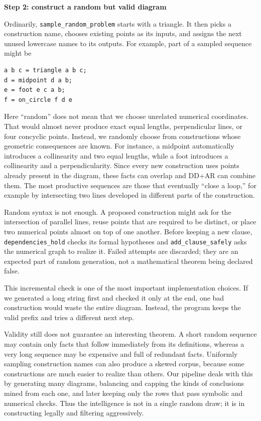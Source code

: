 \documentclass[reqno]{amsart}
\newcommand{\examplepart}[1]{%
    \par\medskip
    \noindent\textbf{\color{agblue}#1}\par\smallskip\noindent
}
\DeclareMathOperator{\1}{\textbf{1}}
\begin{document}
\examplepart{Step 2: construct a random but valid diagram}

Ordinarily, \verb|sample_random_problem| starts with a triangle. It then picks
a construction name, chooses existing points as its inputs, and assigns the
next unused lowercase names to its outputs. For example, part of a sampled
sequence might be
\begin{lstlisting}
a b c = triangle a b c;
d = midpoint d a b;
e = foot e c a b;
f = on_circle f d e
\end{lstlisting}

Here ``random'' does not mean that we choose unrelated numerical coordinates.
That would almost never produce exact equal lengths, perpendicular lines, or
four concyclic points.  Instead, we randomly choose from constructions whose
geometric consequences are known.  For instance, a midpoint automatically
introduces a collinearity and two equal lengths, while a foot introduces a
collinearity and a perpendicularity.  Since every new construction uses
points already present in the diagram, these facts can overlap and DD+AR can
combine them.  The most productive sequences are those that eventually
``close a loop,'' for example by intersecting two lines developed in different
parts of the construction.

Random syntax is not enough. A proposed construction might ask for the
intersection of parallel lines, reuse points that are required to be distinct,
or place two numerical points almost on top of one another. Before keeping a
new clause, \verb|dependencies_hold| checks its formal hypotheses and
\verb|add_clause_safely| asks the numerical graph to realize it. Failed
attempts are discarded; they are an expected part of random generation, not a
mathematical theorem being declared false.

This incremental check is one of the most important implementation choices.
If we generated a long string first and checked it only at the end, one bad
construction would waste the entire diagram. Instead, the program keeps the
valid prefix and tries a different next step.

Validity still does not guarantee an interesting theorem.  A short random
sequence may contain only facts that follow immediately from its definitions,
whereas a very long sequence may be expensive and full of redundant facts.
Uniformly sampling construction names can also produce a skewed corpus,
because some constructions are much easier to realize than others.  Our
pipeline deals with this by generating many diagrams, balancing and capping
the kinds of conclusions mined from each one, and later keeping only the rows
that pass symbolic and numerical checks.  Thus the intelligence is not in a
single random draw; it is in constructing legally and filtering aggressively.
\end{document}
